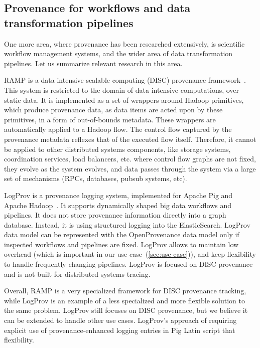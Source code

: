 \begin{comment} GP: Myślę, że tego nie użyję w ogóle.
Provenance segmentation
\url{https://www.usenix.org/system/files/conference/tapp16/tapp16-paper-abreu.pdf} as a mechanism to deal with data volumes.
\end{comment}

\subsection{Provenance for workflows and data transformation pipelines} 

One more area, where provenance has been researched extensively, is scientific workflow management systems, and the wider area of data transformation pipelines. Let us summarize relevant research in this area.

RAMP is a data intensive scalable computing (DISC) provenance framework~\cite{ramp-ikeda2011provenance}. This system is restricted to the domain of data intensive computations, over static data. It is implemented as a set of wrappers around Hadoop primitives, which produce provenance data, as data items are acted upon by these primitives, in a form of out-of-bounds metadata.  These wrappers are automatically applied to a Hadoop flow. The control flow captured by the provenance metadata reflexes that of the executed flow itself. Therefore, it cannot be applied to other distributed systems components, like storage systems, coordination services, load balancers, etc. where control flow graphs are not fixed, they evolve as the system evolves, and data passes through the system via a large set of mechanisms (RPCs, databases, pubsub systems, etc).

LogProv is a provenance logging system, implemented for Apache Pig and Apache Hadoop~\cite{logprov-wang2016}. It supports dynamically shaped big data workflows and pipelines. It does not store provenance information directly into a graph database. Instead, it is using structured logging into the ElasticSearch. LogProv data model can be represented with the OpenProvenance data model only if inspected workflows and pipelines are fixed. LogProv allows to maintain low overhead (which is important in our use case~(\cref{sec:use-case})), and keep flexibility to handle frequently changing pipelines. LogProv is focused on DISC provenance and is not built for distributed systems tracing.

Overall, RAMP is a very specialized framework for DISC provenance tracking, while LogProv is an example of a less specialized and more flexible solution to the same problem. LogProv still focuses on DISC provenance, but we believe it can be extended to handle other use cases. LogProv's approach of requiring explicit use of provenance-enhanced logging entries in Pig Latin script that flexibility.

